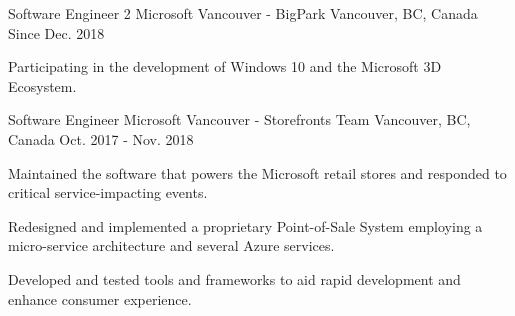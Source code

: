 

\begin{cventries}

  \cventry
    {Software Engineer 2} %
    {Microsoft Vancouver - BigPark} %
    {Vancouver, BC, Canada} %
    {Since Dec. 2018} %
    {
      \begin{cvitems} %
	      \item {Participating in the development of Windows 10 and the Microsoft 3D Ecosystem.}
        \\
      \end{cvitems}
    }

  \cventry
    {Software Engineer} %
    {Microsoft Vancouver - Storefronts Team} %
    {Vancouver, BC, Canada} %
    {Oct. 2017 - Nov. 2018} %
    {
      \begin{cvitems} %
	      \item {Maintained the software that powers the Microsoft retail stores and responded to critical service-impacting events.}
	      \item {Redesigned and implemented a proprietary Point-of-Sale System employing a micro-service architecture and several Azure services.}
        \item {Developed and tested tools and frameworks to aid rapid development and enhance consumer experience.}
        \\
      \end{cvitems}
    }


\end{cventries}
